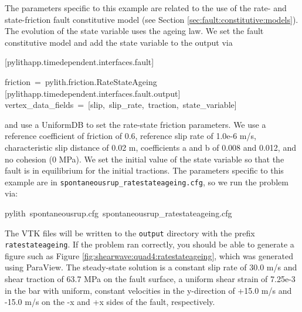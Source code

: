 The parameters specific to this example are related to the use of
the rate- and state-friction fault constitutive model (see Section
\ref{sec:fault:constitutive:models}). The evolution of the state
variable uses the ageing law. We set the fault constitutive model
and add the state variable to the output via
\begin{lyxcode}
{[}pylithapp.timedependent.interfaces.fault{]}

friction~=~pylith.friction.RateStateAgeing~\\


{[}pylithapp.timedependent.interfaces.fault.output{]}~\\
vertex\_data\_fields~=~{[}slip,~slip\_rate,~traction,~state\_variable{]}~
\end{lyxcode}
and use a UniformDB to set the rate-state friction parameters. We
use a reference coefficient of friction of 0.6, reference slip rate
of 1.0e-6 m/s, characteristic slip distance of 0.02 m, coefficients
a and b of 0.008 and 0.012, and no cohesion (0 MPa). We set the initial
value of the state variable so that the fault is in equilibrium for
the initial tractions. The parameters specific to this example are
in \texttt{spontaneousrup\_ratestateageing.cfg}, so we run the problem
via:
\begin{lyxcode}
pylith~spontaneousrup.cfg~spontaneousrup\_ratestateageing.cfg
\end{lyxcode}
The VTK files will be written to the \texttt{output} directory with
the prefix \texttt{ratestateageing}. If the problem ran correctly,
you should be able to generate a figure such as Figure \ref{fig:shearwave:quad4:ratestateageing},
which was generated using ParaView. The steady-state solution is a
constant slip rate of 30.0 m/s and shear traction of 63.7 MPa on the
fault surface, a uniform shear strain of 7.25e-3 in the bar with uniform,
constant velocities in the y-direction of +15.0 m/s and -15.0 m/s
on the -x and +x sides of the fault, respectively.

